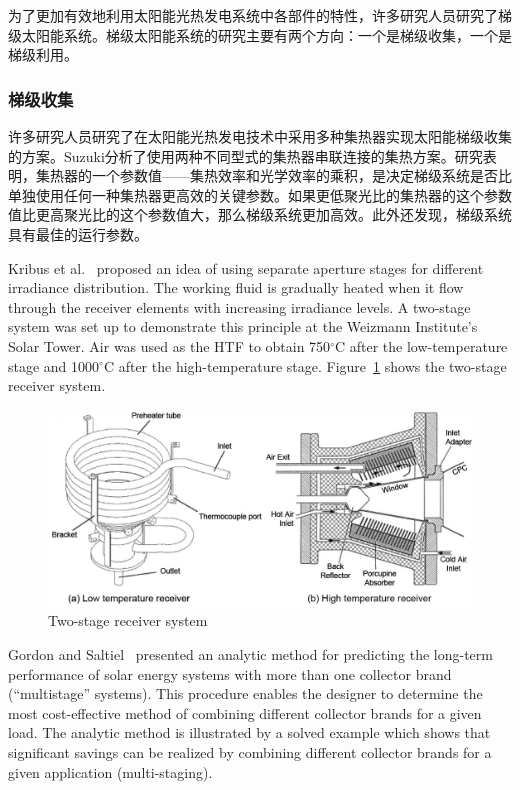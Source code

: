 为了更加有效地利用太阳能光热发电系统中各部件的特性，许多研究人员研究了梯级太阳能系统。梯级太阳能系统的研究主要有两个方向：一个是梯级收集，一个是梯级利用。

\subsubsection{梯级收集}

许多研究人员研究了在太阳能光热发电技术中采用多种集热器实现太阳能梯级收集的方案。Suzuki\cite{Suzuki1986}分析了使用两种不同型式的集热器串联连接的集热方案。研究表明，集热器的一个参数值——集热效率和光学效率的乘积，是决定梯级系统是否比单独使用任何一种集热器更高效的关键参数。如果更低聚光比的集热器的这个参数值比更高聚光比的这个参数值大，那么梯级系统更加高效。此外还发现，梯级系统具有最佳的运行参数。

Kribus et al.~\cite{Kribus1999} proposed an idea of using separate aperture stages for different irradiance distribution. The working fluid is gradually heated when it flow through the receiver elements with increasing irradiance levels. A two-stage system was set up to demonstrate this principle at the Weizmann Institute's Solar Tower. Air was used as the HTF to obtain 750$\mathrm{^\circ C}$ after the low-temperature stage and 1000$\mathrm{^\circ C}$ after the high-temperature stage. Figure~\ref{fig:Kribus1999} shows the two-stage receiver system.
\begin{figure}[!ht]
\centering
\includegraphics[width=.8\textwidth]{fig/Kribus1999.jpg}
\caption{Two-stage receiver system}
\label{fig:Kribus1999}
\end{figure}

Gordon and Saltiel~\cite{Gordon1986} presented an analytic method for predicting the long-term performance of solar energy systems with more than one collector brand (``multistage'' systems). This procedure enables the designer to determine the most cost-effective method of combining different collector brands for a given load. The analytic method is illustrated by a solved example which shows that significant savings can be realized by combining different collector brands for a given application (multi-staging).

